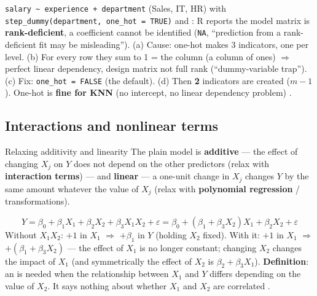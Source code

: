 \begin{trap}[one\_hot = TRUE + intercept = rank deficient (PE Q13)]
\texttt{salary \textasciitilde{} experience + department} (Sales, IT, HR) with \texttt{step\_dummy(department, one\_hot = TRUE)} and : R reports the model matrix is \textbf{rank-deficient}, a coefficient cannot be identified (\texttt{NA}, ``prediction from a rank-deficient fit may be misleading'').
(a) Cause: one-hot makes 3 indicators, one per level. (b) For every row they sum to 1 = the  column (a column of ones) $\Rightarrow$ perfect linear dependency, design matrix not full rank (``dummy-variable trap''). (c) Fix: \texttt{one\_hot = FALSE} (the default). (d) Then \textbf{2} indicators are created ($m-1$).
One-hot is \textbf{fine for KNN} (no intercept, no linear dependency problem) .
\end{trap}

\subsection{Interactions and nonlinear terms}
\begin{topic}{Relaxing additivity and linearity}
 The plain model is \textbf{additive} --- the effect of changing $X_j$ on $Y$ does not depend on the other predictors (relax with \textbf{interaction terms}) --- and \textbf{linear} --- a one-unit change in $X_j$ changes $Y$ by the same amount whatever the value of $X_j$ (relax with \textbf{polynomial regression} / transformations).
\end{topic}

\begin{keybox}[Interaction (S2.49)]
\[ Y=\beta_0+\beta_1X_1+\beta_2X_2+\beta_3X_1X_2+\varepsilon=\beta_0+(\beta_1+\beta_3X_2)X_1+\beta_2X_2+\varepsilon \]
Without $X_1X_2$: $+1$ in $X_1$ $\Rightarrow$ $+\beta_1$ in $Y$ (holding $X_2$ fixed). With it: $+1$ in $X_1$ $\Rightarrow$ $+(\beta_1+\beta_3X_2)$ --- the effect of $X_1$ is no longer constant; changing $X_2$ changes the impact of $X_1$ (and symmetrically the effect of $X_2$ is $\beta_2+\beta_3X_1$).
\textbf{Definition}: an  is needed when the relationship between $X_1$ and $Y$ differs depending on the value of $X_2$. It says nothing about whether $X_1$ and $X_2$ are correlated .
\end{keybox}

